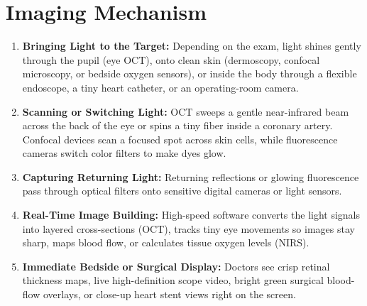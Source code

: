 \section{Imaging Mechanism}
\begin{enumerate}
  \item \textbf{Bringing Light to the Target:} Depending on the exam, light shines gently through the pupil (eye OCT), onto clean skin (dermoscopy, confocal microscopy, or bedside oxygen sensors), or inside the body through a flexible endoscope, a tiny heart catheter, or an operating-room camera.
  \item \textbf{Scanning or Switching Light:} OCT sweeps a gentle near-infrared beam across the back of the eye or spins a tiny fiber inside a coronary artery. Confocal devices scan a focused spot across skin cells, while fluorescence cameras switch color filters to make dyes glow.
  \item \textbf{Capturing Returning Light:} Returning reflections or glowing fluorescence pass through optical filters onto sensitive digital cameras or light sensors.
  \item \textbf{Real-Time Image Building:} High-speed software converts the light signals into layered cross-sections (OCT), tracks tiny eye movements so images stay sharp, maps blood flow, or calculates tissue oxygen levels (NIRS).
  \item \textbf{Immediate Bedside or Surgical Display:} Doctors see crisp retinal thickness maps, live high-definition scope video, bright green surgical blood-flow overlays, or close-up heart stent views right on the screen.
\end{enumerate}

